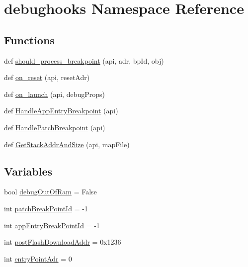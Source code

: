 \hypertarget{namespacedebughooks}{}\section{debughooks Namespace Reference}
\label{namespacedebughooks}
\subsection*{Functions}
\begin{DoxyCompactItemize}
\item 
def \hyperlink{namespacedebughooks_acdaada684f14959e258414534d569f71}{should\+\_\+process\+\_\+breakpoint} (api, adr, bp\+Id, obj)
\item 
def \hyperlink{namespacedebughooks_a0ee6ce3e0aacdd1e5758492f69f995f8}{on\+\_\+reset} (api, reset\+Adr)
\item 
def \hyperlink{namespacedebughooks_ac7b06df66dc219922f1ad5a6734f71c6}{on\+\_\+launch} (api, debug\+Props)
\item 
def \hyperlink{namespacedebughooks_a71d3491d80d320fc8f85383489af96ec}{Handle\+App\+Entry\+Breakpoint} (api)
\item 
def \hyperlink{namespacedebughooks_a673ca6fc076f03549c0078ee764a5786}{Handle\+Patch\+Breakpoint} (api)
\item 
def \hyperlink{namespacedebughooks_a80cb4755d936e703c396376b7d9b05b5}{Get\+Stack\+Addr\+And\+Size} (api, map\+File)
\end{DoxyCompactItemize}
\subsection*{Variables}
\begin{DoxyCompactItemize}
\item 
bool \hyperlink{namespacedebughooks_a4453080c049b935096a9399726aaff65}{debug\+Out\+Of\+Ram} = False
\item 
int \hyperlink{namespacedebughooks_ace200a02851163ba9904ccdde2991a30}{patch\+Break\+Point\+Id} = -\/1
\item 
int \hyperlink{namespacedebughooks_af0787e398633654faa72900223e5dd40}{app\+Entry\+Break\+Point\+Id} = -\/1
\item 
int \hyperlink{namespacedebughooks_a7085fd6725027f087010919eb35a91a9}{post\+Flash\+Download\+Addr} = 0x1236
\item 
int \hyperlink{namespacedebughooks_a10baaf1b59cde3b326d8dcc5ed34bfbf}{entry\+Point\+Adr} = 0
\end{DoxyCompactItemize}


